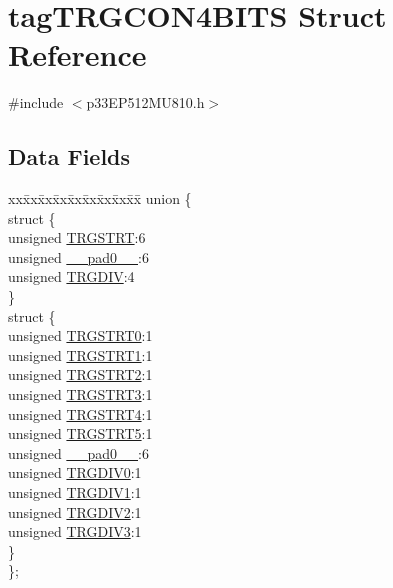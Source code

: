 \hypertarget{structtag_t_r_g_c_o_n4_b_i_t_s}{}\section{tag\+T\+R\+G\+C\+O\+N4\+B\+I\+TS Struct Reference}
\label{structtag_t_r_g_c_o_n4_b_i_t_s}


{\ttfamily \#include $<$p33\+E\+P512\+M\+U810.\+h$>$}

\subsection*{Data Fields}
\begin{DoxyCompactItemize}
\item 
\begin{tabbing}
xx\=xx\=xx\=xx\=xx\=xx\=xx\=xx\=xx\=\kill
union \{\\
\>struct \{\\
\>\>unsigned \hyperlink{structtag_t_r_g_c_o_n4_b_i_t_s_a53d84dcc3e23b3d2db356ea32c245b6f}{TRGSTRT}:6\\
\>\>unsigned \hyperlink{structtag_t_r_g_c_o_n4_b_i_t_s_adf71f3d8410c1f1dbbc96680a92c49af}{\_\_pad0\_\_}:6\\
\>\>unsigned \hyperlink{structtag_t_r_g_c_o_n4_b_i_t_s_a10310cfb772e07d5f62911d0619c3ae0}{TRGDIV}:4\\
\>\} \\
\>struct \{\\
\>\>unsigned \hyperlink{structtag_t_r_g_c_o_n4_b_i_t_s_a75147b4831d3afa487fe9999d2a58c67}{TRGSTRT0}:1\\
\>\>unsigned \hyperlink{structtag_t_r_g_c_o_n4_b_i_t_s_ac76b84548f8cfa382a2d703890b58dad}{TRGSTRT1}:1\\
\>\>unsigned \hyperlink{structtag_t_r_g_c_o_n4_b_i_t_s_a66e40dba969f7a5eafe81b8f341dd665}{TRGSTRT2}:1\\
\>\>unsigned \hyperlink{structtag_t_r_g_c_o_n4_b_i_t_s_a20e528d9be27fc91e2d28bb69f809c0a}{TRGSTRT3}:1\\
\>\>unsigned \hyperlink{structtag_t_r_g_c_o_n4_b_i_t_s_a9e26684d05dfb877c150795a627387cc}{TRGSTRT4}:1\\
\>\>unsigned \hyperlink{structtag_t_r_g_c_o_n4_b_i_t_s_aabeb06bb6258310e01e1a0cd96bf30ca}{TRGSTRT5}:1\\
\>\>unsigned \hyperlink{structtag_t_r_g_c_o_n4_b_i_t_s_adf71f3d8410c1f1dbbc96680a92c49af}{\_\_pad0\_\_}:6\\
\>\>unsigned \hyperlink{structtag_t_r_g_c_o_n4_b_i_t_s_a6d425374bc65bb89be540344ef5393e5}{TRGDIV0}:1\\
\>\>unsigned \hyperlink{structtag_t_r_g_c_o_n4_b_i_t_s_a92a66ed2923cfb0f855e3d9fe36654f9}{TRGDIV1}:1\\
\>\>unsigned \hyperlink{structtag_t_r_g_c_o_n4_b_i_t_s_a8a4ec980bd7f8bdb174f00a7888cdfce}{TRGDIV2}:1\\
\>\>unsigned \hyperlink{structtag_t_r_g_c_o_n4_b_i_t_s_a0b99e8f3f8539f9bf133127a32824612}{TRGDIV3}:1\\
\>\} \\
\}; \\


\end{tabbing}
\end{DoxyCompactItemize}
